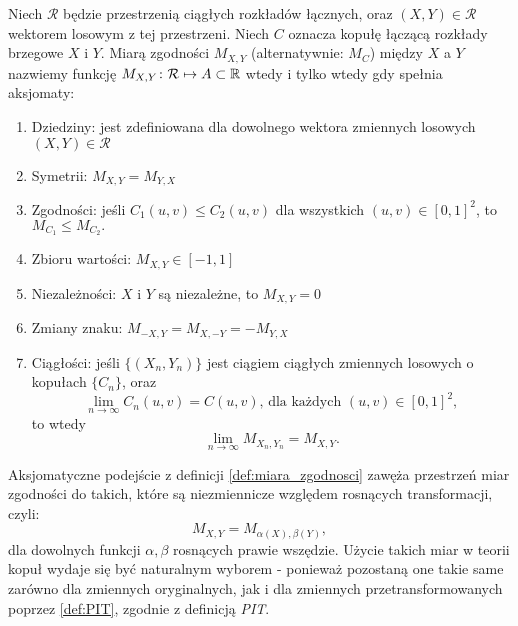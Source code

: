 \begin{df}
	Niech $\mathcal{R}$ będzie przestrzenią ciągłych rozkładów łącznych, oraz $(X, Y) \in \mathcal{R}$ wektorem losowym z tej przestrzeni. Niech $C$ oznacza kopułę łączącą rozkłady brzegowe $X$ i $Y$. Miarą zgodności $M_{X,Y}$ (alternatywnie: $M_C$) między $X$ a $Y$ nazwiemy funkcję $M_{X,Y}\colon \mathcal{R}\mapsto A\subset\mathbb{R}$ wtedy i tylko wtedy gdy spełnia aksjomaty:
	\begin{enumerate}
		\item Dziedziny: jest zdefiniowana dla dowolnego wektora zmiennych losowych $(X, Y) \in \mathcal{R}$
		\item Symetrii: $M_{X,Y}=M_{Y,X}$
		\item Zgodności: jeśli $C_1(u,v) \leqslant C_2(u,v)$ dla wszystkich $(u, v)\in[0,1]^2$, to $M_{C_1} \leqslant M_{C_2}.$
		\item Zbioru wartości: $M_{X,Y}\in[-1,1]$
		\item Niezależności: $X$ i $Y$ są niezależne, to $M_{X,Y}=0$
		\item Zmiany znaku: $M_{-X,Y}=M_{X,-Y}=-M_{Y,X}$
		\item Ciągłości: jeśli $\{(X_n,Y_n)\}$ jest ciągiem ciągłych zmiennych losowych o kopułach $\{C_n\}$, oraz 
		$$ \lim\limits_{n\to\infty} C_n(u, v) =C(u, v)\text{, dla każdych }(u, v)\in[0,1]^2,$$
		to wtedy
		$$ \lim\limits_{n\to\infty}M_{X_n,Y_n}=M_{X,Y}.$$
	\end{enumerate}
	\label{def:miara_zgodnosci}		
\end{df}
Aksjomatyczne podejście z definicji \ref{def:miara_zgodnosci} zawęża przestrzeń miar zgodności do takich, które są niezmiennicze względem rosnących transformacji, czyli:
$$ M_{X,Y} = M_{\alpha(X), \beta(Y)},$$
dla dowolnych funkcji $\alpha,\beta$ rosnących prawie wszędzie. Użycie takich miar w teorii kopuł wydaje się być naturalnym wyborem - ponieważ pozostaną one takie same zarówno dla zmiennych oryginalnych, jak i dla zmiennych przetransformowanych poprzez \ref{def:PIT}, zgodnie z  definicją \emph{PIT}.\\